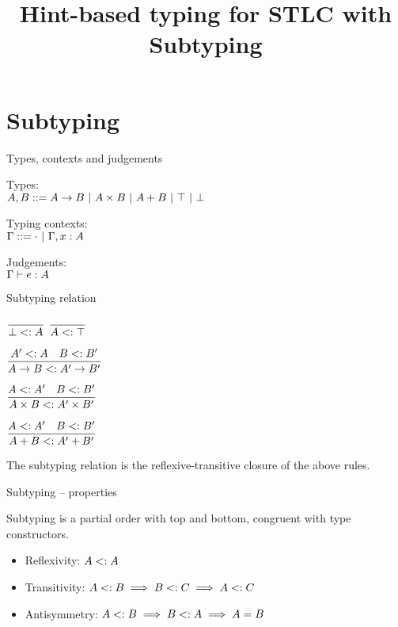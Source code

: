 \documentclass{beamer}
\title{Hint-based typing for STLC with Subtyping}
\date{}
\begin{document}
\frame{\titlepage}

\section{Subtyping}

\begin{frame}{Types, contexts and judgements}

Types: \\
$A, B ::= A \to B \ |\  A \times B \ |\  A + B \ |\  \top \ |\  \bot$

\vspace{2em}

Typing contexts: \\
$\Gamma ::= \emptytypingctx \pipe \extend{\Gamma}{x}{A}$

\vspace{2em}

Judgements: \\
$\typing[\Gamma]{e}{A}$

\end{frame}

\begin{frame}{Subtyping relation}

\begin{center}
  $\displaystyle \frac{}{\bot <: A} \textsc{\footnotesize{}}$ \quad
  $\displaystyle \frac{}{A <: \top} \textsc{\footnotesize{}}$

  \vspace{2em}

  $\displaystyle \frac{A' <: A \quad B <: B'}{A \to B <: A' \to B'} \textsc{\footnotesize{}}$

  \vspace{2em}

  $\displaystyle \frac{A <: A' \quad B <: B'}{A \times B <: A' \times B'} \textsc{\footnotesize{}}$

  \vspace{2em}

  $\displaystyle \frac{A <: A' \quad B <: B'}{A + B <: A' + B'} \textsc{\footnotesize{}}$
\end{center}

\vspace{2em}

The subtyping relation is the reflexive-transitive closure of the above rules.

\end{frame}

\begin{frame}{Subtyping -- properties}

Subtyping is a partial order with top and bottom, congruent with type constructors.

\begin{itemize}
  \item Reflexivity: $A <: A$
  \item Transitivity: $A <: B \implies B <: C \implies A <: C$
  \item Antisymmetry: $A <: B \implies B <: A \implies A = B$
\end{itemize}

\end{frame}
\end{document}
